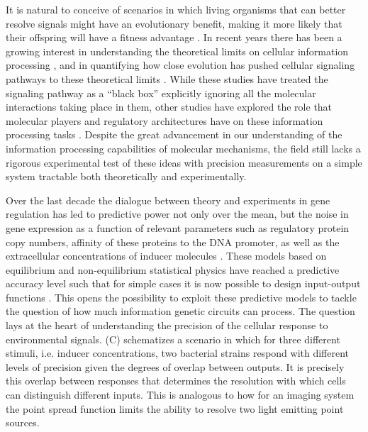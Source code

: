 It is natural to conceive of scenarios in which living organisms that can better
resolve signals might have an evolutionary benefit, making it more likely that
their offspring will have a fitness advantage \cite{Taylor2007a}. In recent
years there has been a growing interest in understanding the theoretical limits
on cellular information processing \cite{Bialek2005, Gregor2007}, and in
quantifying how close evolution has pushed cellular signaling pathways to these
theoretical limits \cite{Tkacik2008, Dubuis2013, Petkova2016}. While these
studies have treated the signaling pathway as a ``black box'' explicitly
ignoring all the molecular interactions taking place in them, other studies have
explored the role that molecular players and regulatory architectures have on
these information processing tasks \cite{Rieckh2014, Ziv2007, Voliotis2014a,
Tostevin2009, Tkacik2011, Tkacik2008a, Tabbaa2014}. Despite the great
advancement in our understanding of the information processing capabilities of
molecular mechanisms, the field still lacks a rigorous experimental test of
these ideas with precision measurements on a simple system tractable both
theoretically and experimentally.

Over the last decade the dialogue between theory and experiments in gene
regulation has led to predictive power not only over the mean, but the noise in
gene expression as a function of relevant parameters such as regulatory protein
copy numbers, affinity of these proteins to the DNA promoter, as well as the
extracellular concentrations of inducer molecules \cite{Golding2005,
Garcia2011c, Vilar2013, Xu2015}. These models based on equilibrium and
non-equilibrium statistical physics have reached a predictive accuracy level
such that for simple cases it is now possible to design input-output functions
\cite{Brewster2012, Barnes2018}. This opens the possibility to exploit these
predictive models to tackle the question of how much information genetic
circuits can process. The question lays at the heart of understanding the
precision of the cellular response to environmental signals.
(C) schematizes a scenario in which for three different
stimuli, i.e. inducer concentrations, two bacterial strains respond with
different levels of precision given the degrees of overlap between outputs. It
is precisely this overlap between responses that determines the resolution with
which cells can distinguish different inputs. This is analogous to how for an
imaging system the point spread function limits the ability to resolve two light
emitting point sources.

